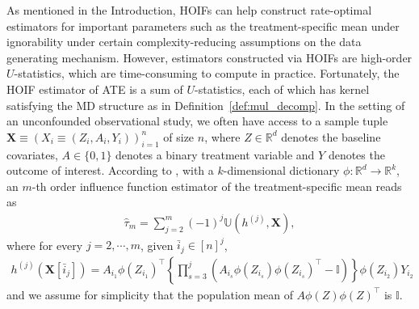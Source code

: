 \documentclass[12pt]{article}
\theoremstyle{plain}
\theoremstyle{definition}
\newcommand{\ustat}{\mathbb{U}}
\newcommand{\bbR}{{\mathbb{R}}}
\begin{document}
\begin{bibunit}[agsm]
As mentioned in the Introduction, HOIFs \citep{robins2008higher} can help construct rate-optimal estimators for important parameters such as the treatment-specific mean under ignorability under certain complexity-reducing assumptions on the data generating mechanism. However, estimators constructed via HOIFs are high-order $U$-statistics, which are time-consuming to compute in practice. Fortunately, the HOIF estimator of ATE is a sum of $U$-statistics, each of which has kernel satisfying the MD structure as in Definition~\ref{def:mul_decomp}. 
In the setting of an unconfounded observational study, we often have access to a sample tuple $\bm{X} \equiv (X_{i} \equiv (Z_{i}, A_{i}, Y_{i}))_{i = 1}^{n}$ of size $n$, where $Z \in \bbR^{d}$ denotes the baseline covariates, $A \in \{0, 1\}$ denotes a binary treatment variable and $Y$ denotes the outcome of interest. According to \citet{robins2008higher}, with a $k$-dimensional dictionary $\phi: \bbR^{d} \rightarrow \bbR^{k}$, an $m$-th order influence function estimator of the treatment-specific mean reads as
\begin{align*}
 \hat{\tau}_{m} = \sum_{j = 2}^{m} (-1)^{j} \ustat (h^{(j)}, \bm{X}), 
\end{align*}
where for every $j = 2, \cdots, m$, given $\bar{i}_{j} \in [n]^j$,
\begin{align*}
 h^{(j)} (\bm{X}[\bar{i}_{j}]) = A_{i_{1}} \phi (Z_{i_{1}})^{\top} \left\{ \prod_{s = 3}^{j} \left( A_{i_{s}} \phi (Z_{i_{s}}) \phi (Z_{i_{s}})^{\top} - \mathbb{I} \right) \right\} \phi (Z_{i_{2}}) Y_{i_{2}}
\end{align*}
and we assume for simplicity that the population mean of $A \phi (Z) \phi (Z)^{\top}$ is $\mathbb{I}$.


\end{bibunit}
\end{document}
